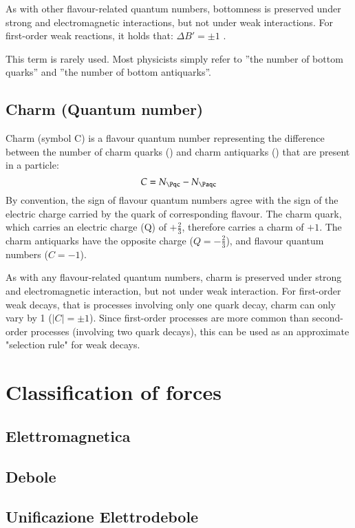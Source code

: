 \documentclass[main.tex]{subfiles}
\begin{document}
As with other flavour-related quantum numbers, bottomness is preserved under strong and electromagnetic interactions, but not under weak interactions. For first-order weak reactions, it holds that: $\Delta B'=\pm1$ .

This term is rarely used. Most physicists simply refer to ''the number of bottom quarks'' and ''the number of bottom antiquarks''.

\subsection{Charm (Quantum number)}

Charm (symbol C) is a flavour quantum number representing the difference between the number of charm quarks (\Pqc) and charm antiquarks (\Paqc) that are present in a particle:
\begin{equation*}
C=N_{\Pqc}-N_{\Paqc}
\end{equation*}
By convention, the sign of flavour quantum numbers agree with the sign of the electric charge carried by the quark of corresponding flavour. The charm quark, which carries an electric charge (Q) of $+\frac{2}{3}$, therefore carries a charm of $+1$. The charm antiquarks have the opposite charge ($Q=-\frac{2}{3}$), and flavour quantum numbers ($C=-1$).

As with any flavour-related quantum numbers, charm is preserved under strong and electromagnetic interaction, but not under weak interaction. For first-order weak decays, that is processes involving only one quark decay, charm can only vary by 1 ($|C|=\pm1$). Since first-order processes are more common than second-order processes (involving two quark decays), this can be used as an approximate "selection rule" for weak decays.

\section{Classification of forces}


\subsection{Elettromagnetica}

\subsection{Debole}

\subsection{Unificazione Elettrodebole}
\end{document}
